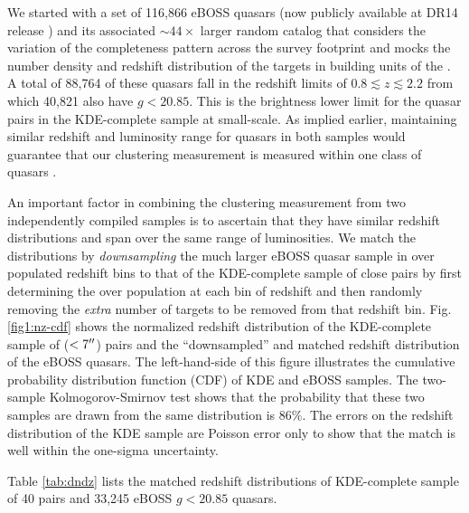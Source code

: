 \documentclass[useAMS,usenatbib]{mn2e}
\begin{document}
We started with a set of 116{,}866 eBOSS quasars (now publicly available at  DR14 release \citet{dr14}) and its associated $\sim 44 \times$ larger random catalog that considers the variation of the completeness pattern across the survey footprint and mocks the number density and redshift distribution of the targets in building units of the \citet[see][]{sw08b,la17}. A total of 88{,}764 of these quasars fall in the redshift limits of $0.8\lesssim z \lesssim 2.2$ from which 40{,}821 also have $g<20.85$. This is the brightness lower limit for the quasar pairs in the KDE-complete sample at small-scale. As implied earlier, maintaining similar redshift and luminosity range for quasars in both samples would guarantee that our clustering measurement is measured within one class of quasars \citep[see, e.g., ][for discussions on whether quasars from different luminosity classes posses different clustering properties]{she07,All11,sh13,All14,ef15,mg16}.     

An important factor in combining the clustering measurement from two independently compiled samples is to ascertain that they have similar redshift distributions and span over the same range of luminosities. We match the distributions by {\it downsampling} the much larger eBOSS quasar sample in over populated redshift bins to that of the KDE-complete sample of close pairs by first determining the over population at each bin of redshift and then randomly removing the {\it extra} number of targets to be removed from that redshift bin. Fig. \ref{fig1:nz-cdf} shows the normalized redshift distribution of the KDE-complete sample of ($<7 \arcsec$) pairs and the ``downsampled'' and matched redshift distribution of the eBOSS quasars. The left-hand-side of this figure illustrates the cumulative probability distribution function (CDF) of KDE and eBOSS samples. The two-sample Kolmogorov-Smirnov test shows that the probability that these two samples are drawn from the same distribution is $86\%$. The errors on the redshift distribution of the KDE sample are Poisson error only to show that the match is well within the one-sigma uncertainty. 
 
 Table \ref{tab:dndz} lists the matched redshift distributions of KDE-complete sample of 40 pairs and 33{,}245 eBOSS $g<20.85$ quasars. 
  
\end{document}
